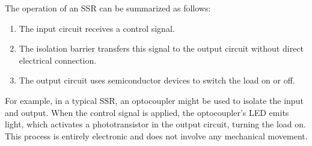 The operation of an SSR can be summarized as follows:
\begin{enumerate}
    \item The input circuit receives a control signal.
    \item The isolation barrier transfers this signal to the output circuit without direct electrical connection.
    \item The output circuit uses semiconductor devices to switch the load on or off.
\end{enumerate}

For example, in a typical SSR, an optocoupler might be used to isolate the input and output. When the control signal is applied, the optocoupler's LED emits light, which activates a phototransistor in the output circuit, turning the load on. This process is entirely electronic and does not involve any mechanical movement.

